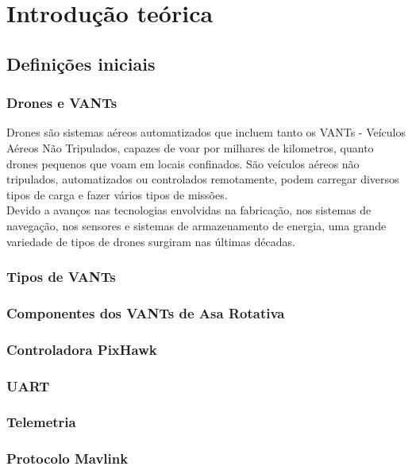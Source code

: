 \documentclass[12pt,a4paper,oneside]{book}
\begin{document}
%

\chapter{Introdução teórica}
%
\thispagestyle{empty} 
%


\section{Definições iniciais}

\subsection{Drones e VANTs}
Drones são sistemas aéreos automatizados que incluem tanto os VANTs - Veículos Aéreos Não Tripulados, capazes de voar por milhares de 
kilometros, quanto drones pequenos que voam em locais confinados. São veículos aéreos não tripulados, automatizados ou controlados 
remotamente, podem carregar diversos tipos de carga e fazer vários tipos de missões.\\
Devido a avanços nas tecnologias envolvidas na fabricação, nos sistemas de navegação, nos sensores e sistemas de armazenamento de 
energia, uma grande variedade de tipos de drones surgiram nas últimas décadas. 

\subsection{Tipos de VANTs}

\subsection{Componentes dos VANTs de Asa Rotativa}

\subsection{Controladora PixHawk}

\subsection{UART}

\subsection{Telemetria}

\subsection{Protocolo Mavlink}
\end{document}

